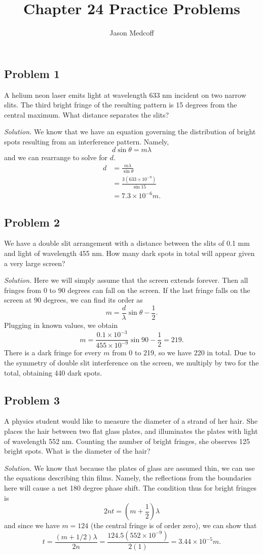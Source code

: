 \documentclass{article}
\title{Chapter 24 Practice Problems}
\author{Jason Medcoff}
\date{}
\begin{document}
	\maketitle
	
	\subsection{Problem 1}
	A helium neon laser emits light at wavelength 633 nm incident on two narrow slits. The third bright fringe of the resulting pattern is 15 degrees from the central maximum. What distance separates the slits?
	
	\textit{Solution.}
	We know that we have an equation governing the distribution of bright spots resulting from an interference pattern. Namely,
	$$ d\sin\theta = m\lambda $$
	and we can rearrange to solve for $d$.
	\begin{equation*}
	\begin{split}
	d & = \frac{m\lambda}{\sin\theta} \\
	  & = \frac{3(633 \times 10^{-9})}{\sin 15} \\
	  & = 7.3 \times 10^{-6} m .
	\end{split}
	\end{equation*}
	
	
	\subsection{Problem 2}
	We have a double slit arrangement with a distance between the slits of 0.1 mm and light of wavelength 455 nm. How many dark spots in total will appear given a very large screen?
	
	\textit{Solution.}
	Here we will simply assume that the screen extends forever. Then all fringes from 0 to 90 degrees can fall on the screen. If the last fringe falls on the screen at 90 degrees, we can find its order as
	$$ m = \frac{d}{\lambda}\sin\theta - \frac{1}{2} . $$
	Plugging in known values, we obtain
	$$ m = \frac{0.1 \times 10^{-3}}{455 \times 10^{-9}} \sin 90 - \frac{1}{2} = 219 . $$
	There is a dark fringe for every $m$ from 0 to 219, so we have 220 in total. Due to the symmetry of double slit interference on the screen, we multiply by two for the total, obtaining 440 dark spots.
	
	
	\subsection{Problem 3}
	A physics student would like to measure the diameter of a strand of her hair. She places the hair between two flat glass plates, and illuminates the plates with light of wavelength 552 nm. Counting the number of bright fringes, she observes 125 bright spots. What is the diameter of the hair?
	
	\textit{Solution.}
	We know that because the plates of glass are assumed thin, we can use the equations describing thin films. Namely, the reflections from the boundaries here will cause a net 180 degree phase shift. The condition thus for bright fringes is
	$$ 2nt = (m+\frac{1}{2})\lambda $$
	and since we have $m = 124$ (the central fringe is of order zero), we can show that
	$$ t = \frac{(m + 1/2)\lambda}{2n} = \frac{124.5(552\times 10^{-9})}{2(1)} = 3.44 \times 10^{-5} m . $$
\end{document}
